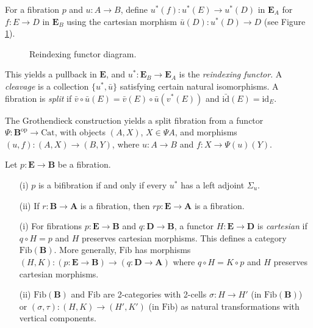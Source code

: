 \documentclass{article}
\begin{document}
For a fibration $p$ and $u : A \to B$, define $u^*(f) : u^*(E) \to u^*(D)$
in $\mathbf{E}_A$ for $f : E \to D$ in $\mathbf{E}_B$ using the cartesian
morphism $\bar{u}(D) : u^*(D) \to D$ (see Figure \ref{fig:reindexing}).
\begin{figure}[h]
    \centering
    \caption{Reindexing functor diagram.}
    \label{fig:reindexing}
\end{figure}
This yields a pullback in $\mathbf{E}$, and $u^* : \mathbf{E}_B \to \mathbf{E}_A$
is the \emph{reindexing functor}. A \emph{cleavage} is a collection
$\{ u^*, \bar{u} \}$ satisfying certain natural isomorphisms. A fibration
is \emph{split} if $\bar{v} \circ \bar{u}(E) = \bar{v}(E) \circ \bar{u}(v^*(E))$
and $\bar{\text{id}}(E) = \text{id}_E$.

The Grothendieck construction yields a split fibration from a functor
$\Psi : \mathbf{B}^{\text{op}} \to \text{Cat}$, with objects $(A, X)$,
$X \in \Psi A$, and morphisms $(u, f) : (A, X) \to (B, Y)$, where
$u : A \to B$ and $f : X \to \Psi(u)(Y)$.

\begin{proposition}
\label{prop:2.3}
Let $p : \mathbf{E} \to \mathbf{B}$ be a fibration.
\begin{enumerate}
    \item[(i)] $p$ is a bifibration if and only if every $u^*$ has a left adjoint $\Sigma_u$.
    \item[(ii)] If $r : \mathbf{B} \to \mathbf{A}$ is a fibration, then $r p : \mathbf{E} \to \mathbf{A}$ is a fibration.
\end{enumerate}
\end{proposition}

\begin{definition}
\label{def:2.4}
\begin{enumerate}
    \item[(i)] For fibrations $p : \mathbf{E} \to \mathbf{B}$ and $q : \mathbf{D} \to \mathbf{B}$, a functor $H : \mathbf{E} \to \mathbf{D}$ is \emph{cartesian} if $q \circ H = p$ and $H$ preserves cartesian morphisms. This defines a category $\text{Fib}(\mathbf{B})$. More generally, $\text{Fib}$ has morphisms $(H, K) : (p : \mathbf{E} \to \mathbf{B}) \to (q : \mathbf{D} \to \mathbf{A})$ where $q \circ H = K \circ p$ and $H$ preserves cartesian morphisms.
    \item[(ii)] $\text{Fib}(\mathbf{B})$ and $\text{Fib}$ are 2-categories with 2-cells $\sigma : H \to H'$ (in $\text{Fib}(\mathbf{B})$) or $(\sigma, \tau) : (H, K) \to (H', K')$ (in $\text{Fib}$) as natural transformations with vertical components.
\end{enumerate}
\end{definition}
\end{document}

